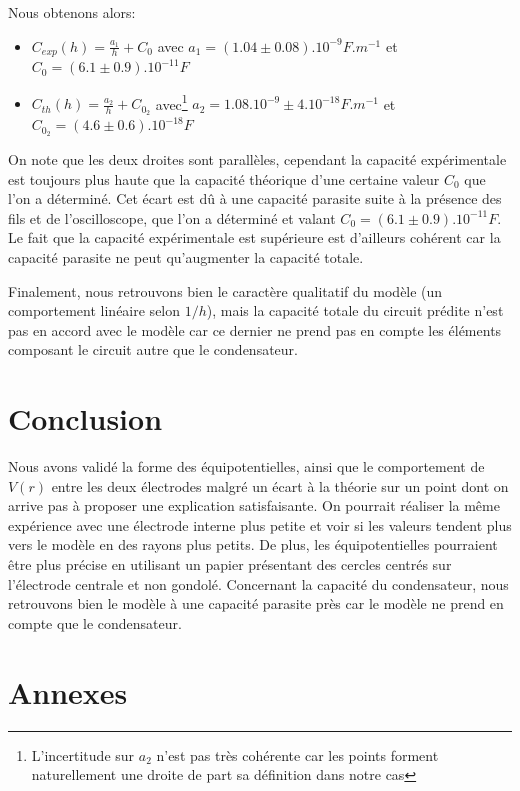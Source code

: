 \documentclass[12pt]{article}
\begin{document}
	Nous obtenons alors:
	\begin{itemize}
		\item $C_{exp}(h) = \frac{a_1 }{h} + C_0$ avec $a_1 = (1.04 \pm 0.08).10^{-9} F.m^{-1}$ et $C_0 = (6.1 \pm 0.9) .10^{-11} F$
		\item $C_{th}(h) = \frac{a_2}{h} + C_{0_2}$ avec\footnote{L'incertitude sur $a_2$ n'est pas très cohérente car les points forment naturellement une droite de part sa définition dans notre cas} $a_2 = 1.08.10^{-9} \pm 4.10^{-18} F.m^{-1}$ et $C_{0_2} = (4.6 \pm 0.6) .10^{-18} F$
	\end{itemize}

	On note que les deux droites sont parallèles, cependant la capacité expérimentale est toujours plus haute que la capacité théorique d'une certaine valeur $C_0$ que l'on a déterminé. Cet écart est dû
	à une capacité parasite suite à la présence des fils et de l'oscilloscope, que l'on a déterminé et valant $C_0 = (6.1 \pm 0.9) .10^{-11} F$. Le fait que la capacité expérimentale est supérieure est d'ailleurs cohérent 
	car la capacité parasite ne peut qu'augmenter la capacité totale.

	Finalement, nous retrouvons bien le caractère qualitatif du modèle (un comportement linéaire selon $1/h$), mais la capacité totale du circuit prédite n'est pas en accord avec le modèle car ce dernier ne prend
	pas en compte les éléments composant le circuit autre que le condensateur. 
	
\section*{Conclusion}	
	Nous avons validé la forme des équipotentielles, ainsi que le comportement de $V(r)$ entre les deux électrodes malgré un écart à la théorie sur un point dont on arrive pas à proposer une explication satisfaisante. 
	On pourrait réaliser la même expérience avec une électrode interne plus petite et voir si les valeurs tendent plus vers le modèle en des rayons plus petits. De plus, les équipotentielles pourraient être plus précise en utilisant un papier
	présentant des cercles centrés sur l'électrode centrale et non gondolé. Concernant la capacité du condensateur, nous retrouvons bien le modèle à une capacité parasite près car le modèle ne prend en compte que le condensateur.

\break
\section*{Annexes}
\end{document}
